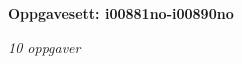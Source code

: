 \centerline{\bf Oppgavesett: i00881no-i00890no}
\vskip 10pt
\centerline{\it 10 oppgaver}\vskip 10pt
\vskip 10pt
